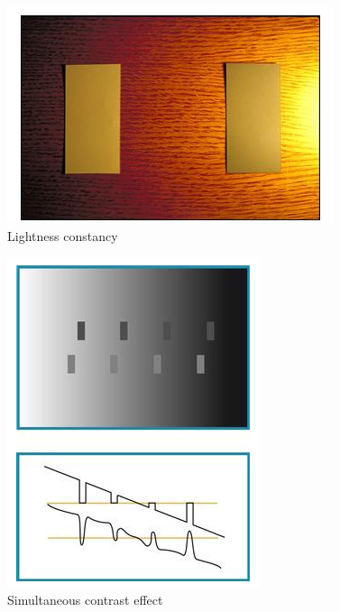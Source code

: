\begin{mdframed}
\begin{multicols}{2}
    \begin{figure}[H]
        \centering
        \includegraphics[width=0.7\linewidth]{lightness_constancy.png}
        \caption{Lightness constancy}
    \end{figure}


    \begin{figure}[H]
        \centering
        \includegraphics[width=0.4\linewidth]{simultaneous_brightness.png}
        \caption{Simultaneous contrast effect}
    \end{figure}
\end{multicols}\end{mdframed}


